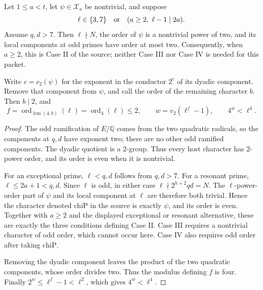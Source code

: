 \begin{srproposition}\label{prop:sr-principal-case-II-arithmetic}
Let \(1\leq a<t\), let \(\psi\in\mathcal X_a\) be nontrivial, and suppose
\[
 \ell\in\{3,7\}\quad\hbox{or}\quad
                    (a\geq2,\ \ell-1\mid2a).
\]
Assume \(q,d>7\). Then \(\ell\nmid N\), the order of \(\psi\) is a
nontrivial power of two, and its local components at odd primes have
order at most two. Consequently, when \(a\geq2\), this is Case II
of the source; neither Case III nor Case IV is needed for this packet.

Write \(c=c_2(\psi)\) for the exponent in the conductor \(2^c\) of its
dyadic component. Remove that component from \(\psi\), and call the
order of the remaining character \(b\). Then \(b\mid2\), and
\[
 f=\operatorname{ord}_{\operatorname{lcm}(4,b)}(\ell)
       =\operatorname{ord}_4(\ell)\leq2,\qquad
 w=v_2(\ell^f-1),\qquad 4^w<\ell^4 .
\]
\end{srproposition}
\begin{proof}
The odd ramification of \(E/\mathbb Q\) comes from the two quadratic
radicals, so the components at \(q,d\) have exponent two; there are no
other odd ramified components. The dyadic quotient is a \(2\)-group.
Thus every host character has \(2\)-power order, and its order is even
when it is nontrivial.

For an exceptional prime, \(\ell<q,d\) follows from \(q,d>7\).
For a resonant prime, \(\ell\leq2a+1<q,d\).
Since \(\ell\) is odd, in either case \(\ell\nmid2^{h+2}qd=N\).
The \(\ell\)-power-order part of \(\psi\) and its local component at
\(\ell\) are therefore both trivial. Hence the character denoted
\(\mathrm{chiP}\) in the source is exactly \(\psi\), and its order is
even. Together with \(a\geq2\) and the displayed exceptional or resonant
alternative, these are exactly the three conditions defining Case II.
Case III requires a nontrivial character of odd order, which cannot
occur here. Case IV also requires odd order after taking \(\mathrm{chiP}\).

Removing the dyadic component leaves the product of the two quadratic
components, whose order divides two. Thus the modulus defining \(f\)
is four. Finally \(2^w\leq\ell^f-1<\ell^2\), which gives \(4^w<\ell^4\).
\end{proof}

